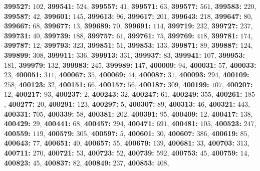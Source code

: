 \textsf{\bfseries 399527:} $102$, \textsf{\bfseries 399541:} $524$, \textsf{\bfseries 399557:} $41$, \textsf{\bfseries 399571:} $63$, \textsf{\bfseries 399577:} $561$, \textsf{\bfseries 399583:} $220$, \textsf{\bfseries 399587:} $42$, \textsf{\bfseries 399601:} $145$, \textsf{\bfseries 399613:} $96$, \textsf{\bfseries 399617:} $201$, \textsf{\bfseries 399643:} $218$, \textsf{\bfseries 399647:} $80$, \textsf{\bfseries 399667:} $68$, \textsf{\bfseries 399677:} $13$, \textsf{\bfseries 399689:} $70$, \textsf{\bfseries 399691:} $114$, \textsf{\bfseries 399719:} $232$, \textsf{\bfseries 399727:} $237$, \textsf{\bfseries 399731:} $40$, \textsf{\bfseries 399739:} $188$, \textsf{\bfseries 399757:} $61$, \textsf{\bfseries 399761:} $75$, \textsf{\bfseries 399769:} $418$, \textsf{\bfseries 399781:} $174$, \textsf{\bfseries 399787:} $12$, \textsf{\bfseries 399793:} $323$, \textsf{\bfseries 399851:} $51$, \textsf{\bfseries 399853:} $133$, \textsf{\bfseries 399871:} $89$, \textsf{\bfseries 399887:} $124$, \textsf{\bfseries 399899:} $308$, \textsf{\bfseries 399911:} $336$, \textsf{\bfseries 399913:} $331$, \textsf{\bfseries 399937:} $83$, \textsf{\bfseries 399941:} $107$, \textsf{\bfseries 399953:} $181$, \textsf{\bfseries 399979:} $132$, \textsf{\bfseries 399983:} $245$, \textsf{\bfseries 399989:} $147$, \textsf{\bfseries 400009:} $94$, \textsf{\bfseries 400031:} $57$, \textsf{\bfseries 400033:} $23$, \textsf{\bfseries 400051:} $311$, \textsf{\bfseries 400067:} $35$, \textsf{\bfseries 400069:} $44$, \textsf{\bfseries 400087:} $31$, \textsf{\bfseries 400093:} $294$, \textsf{\bfseries 400109:} $258$, \textsf{\bfseries 400123:} $32$, \textsf{\bfseries 400151:} $66$, \textsf{\bfseries 400157:} $56$, \textsf{\bfseries 400187:} $309$, \textsf{\bfseries 400199:} $107$, \textsf{\bfseries 400207:} $12$, \textsf{\bfseries 400217:} $93$, \textsf{\bfseries 400237:} $2$, \textsf{\bfseries 400243:} $32$, \textsf{\bfseries 400247:} $61$, \textsf{\bfseries 400249:} $355$, \textsf{\bfseries 400261:} $185$, \textsf{\bfseries 400277:} $20$, \textsf{\bfseries 400291:} $123$, \textsf{\bfseries 400297:} $5$, \textsf{\bfseries 400307:} $89$, \textsf{\bfseries 400313:} $46$, \textsf{\bfseries 400321:} $443$, \textsf{\bfseries 400331:} $705$, \textsf{\bfseries 400339:} $58$, \textsf{\bfseries 400381:} $202$, \textsf{\bfseries 400391:} $95$, \textsf{\bfseries 400409:} $12$, \textsf{\bfseries 400417:} $138$, \textsf{\bfseries 400429:} $29$, \textsf{\bfseries 400441:} $68$, \textsf{\bfseries 400457:} $294$, \textsf{\bfseries 400471:} $691$, \textsf{\bfseries 400481:} $105$, \textsf{\bfseries 400523:} $247$, \textsf{\bfseries 400559:} $119$, \textsf{\bfseries 400579:} $305$, \textsf{\bfseries 400597:} $5$, \textsf{\bfseries 400601:} $30$, \textsf{\bfseries 400607:} $386$, \textsf{\bfseries 400619:} $85$, \textsf{\bfseries 400643:} $77$, \textsf{\bfseries 400651:} $40$, \textsf{\bfseries 400657:} $55$, \textsf{\bfseries 400679:} $139$, \textsf{\bfseries 400681:} $33$, \textsf{\bfseries 400703:} $313$, \textsf{\bfseries 400711:} $270$, \textsf{\bfseries 400721:} $53$, \textsf{\bfseries 400723:} $52$, \textsf{\bfseries 400739:} $592$, \textsf{\bfseries 400753:} $45$, \textsf{\bfseries 400759:} $14$, \textsf{\bfseries 400823:} $45$, \textsf{\bfseries 400837:} $82$, \textsf{\bfseries 400849:} $237$, \textsf{\bfseries 400853:} $408$, 
